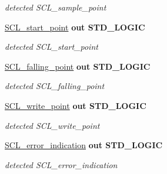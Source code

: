 \begin{DoxyCompactItemize}
\begin{DoxyCompactList}\small\item\em detected S\+C\+L\+\_\+sample\+\_\+point \end{DoxyCompactList}\item 
\hyperlink{class_s_c_l__detect_a9b4735431fce7fbebae38c31c2a846f1}{S\+C\+L\+\_\+start\+\_\+point}  {\bfseries {\bfseries \textcolor{vhdlchar}{out}\textcolor{vhdlchar}{ }}} {\bfseries \textcolor{vhdlchar}{S\+T\+D\+\_\+\+L\+O\+G\+IC}\textcolor{vhdlchar}{ }} \hypertarget{class_s_c_l__detect_a9b4735431fce7fbebae38c31c2a846f1}{}\label{class_s_c_l__detect_a9b4735431fce7fbebae38c31c2a846f1}

\begin{DoxyCompactList}\small\item\em detected S\+C\+L\+\_\+start\+\_\+point \end{DoxyCompactList}\item 
\hyperlink{class_s_c_l__detect_a796eb9e8728ce32e9ece3571c7cca556}{S\+C\+L\+\_\+falling\+\_\+point}  {\bfseries {\bfseries \textcolor{vhdlchar}{out}\textcolor{vhdlchar}{ }}} {\bfseries \textcolor{vhdlchar}{S\+T\+D\+\_\+\+L\+O\+G\+IC}\textcolor{vhdlchar}{ }} \hypertarget{class_s_c_l__detect_a796eb9e8728ce32e9ece3571c7cca556}{}\label{class_s_c_l__detect_a796eb9e8728ce32e9ece3571c7cca556}

\begin{DoxyCompactList}\small\item\em detected S\+C\+L\+\_\+falling\+\_\+point \end{DoxyCompactList}\item 
\hyperlink{class_s_c_l__detect_a0bc61e9a4356bd0e1f0586906eaaf1c9}{S\+C\+L\+\_\+write\+\_\+point}  {\bfseries {\bfseries \textcolor{vhdlchar}{out}\textcolor{vhdlchar}{ }}} {\bfseries \textcolor{vhdlchar}{S\+T\+D\+\_\+\+L\+O\+G\+IC}\textcolor{vhdlchar}{ }} \hypertarget{class_s_c_l__detect_a0bc61e9a4356bd0e1f0586906eaaf1c9}{}\label{class_s_c_l__detect_a0bc61e9a4356bd0e1f0586906eaaf1c9}

\begin{DoxyCompactList}\small\item\em detected S\+C\+L\+\_\+write\+\_\+point \end{DoxyCompactList}\item 
\hyperlink{class_s_c_l__detect_a92ffdda1b6b7220f684d9109606045a0}{S\+C\+L\+\_\+error\+\_\+indication}  {\bfseries {\bfseries \textcolor{vhdlchar}{out}\textcolor{vhdlchar}{ }}} {\bfseries \textcolor{vhdlchar}{S\+T\+D\+\_\+\+L\+O\+G\+IC}\textcolor{vhdlchar}{ }} \hypertarget{class_s_c_l__detect_a92ffdda1b6b7220f684d9109606045a0}{}\label{class_s_c_l__detect_a92ffdda1b6b7220f684d9109606045a0}

\begin{DoxyCompactList}\small\item\em detected S\+C\+L\+\_\+error\+\_\+indication \end{DoxyCompactList}\end{DoxyCompactItemize}


